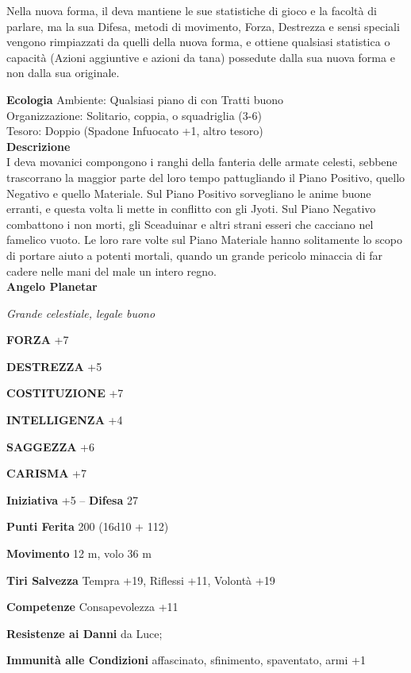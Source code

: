 \begin{multicols}{2}
Nella nuova forma, il deva mantiene le sue statistiche di gioco e la facoltà di parlare, ma la sua Difesa, metodi di movimento, Forza, Destrezza e sensi speciali vengono rimpiazzati da quelli della nuova forma, e ottiene qualsiasi statistica o capacità (Azioni aggiuntive e azioni da tana) possedute dalla sua nuova forma e non dalla sua originale.

\textbf{Ecologia}
Ambiente: Qualsiasi piano di con Tratti buono\\
Organizzazione: Solitario, coppia, o squadriglia (3-6)\\
Tesoro: Doppio (Spadone Infuocato +1, altro tesoro)\\
\textbf{Descrizione}\\
I deva movanici compongono i ranghi della fanteria delle armate celesti, sebbene trascorrano la maggior parte del loro tempo pattugliando il Piano Positivo, quello Negativo e quello Materiale. Sul Piano Positivo sorvegliano le anime buone erranti, e questa volta li mette in conflitto con gli Jyoti. Sul Piano Negativo combattono i non morti, gli Sceaduinar e altri strani esseri che cacciano nel famelico vuoto. Le loro rare volte sul Piano Materiale hanno solitamente lo scopo di portare aiuto a potenti mortali, quando un grande pericolo minaccia di far cadere nelle mani del male un intero regno.\\


\medskip{}\textbf{Angelo Planetar}

\emph{Grande celestiale, legale buono}

\textbf{FORZA} +7

\textbf{DESTREZZA} +5

\textbf{COSTITUZIONE} +7

\textbf{INTELLIGENZA} +4

\textbf{SAGGEZZA} +6

\textbf{CARISMA} +7

\textbf{Iniziativa} +5 -- \textbf{Difesa} 27

\textbf{Punti Ferita} 200 (16d10 + 112)

\textbf{Movimento} 12 m, volo 36 m

\textbf{Tiri Salvezza} Tempra +19, Riflessi +11, Volontà +19

\textbf{Competenze} Consapevolezza +11

\textbf{Resistenze ai Danni} da Luce;

\textbf{Immunità alle Condizioni} affascinato, sfinimento, spaventato, armi +1


\end{multicols}
